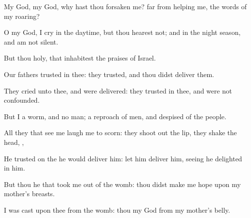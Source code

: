 {\Q {}My
God, my
God, why hast thou
forsaken me?
{}
far from
helping me,
{} the
words of my
roaring?


\par }{\Q {}O my
God, I
cry in the
daytime, but thou
hearest not; and in the night
season, and am not
silent.


\par }{\Q {}But thou
{}
holy,
{} that
inhabitest the
praises of
Israel.


\par }{\Q {}Our
fathers
trusted in thee: they
trusted, and thou didst
deliver them.


\par }{\Q {}They
cried unto thee, and were
delivered: they
trusted in thee, and were not
confounded.


\par }{\Q {}But I
{} a
worm, and no
man; a
reproach of
men, and
despised of the
people.


\par }{\Q {}All they that
see me laugh me to
scorn: they shoot
out the
lip, they
shake the
head,
{},


\par }{\Q {}He
trusted on the
{}
{} he would
deliver him: let him
deliver him, seeing he
delighted in him.


\par }{\Q {}But thou
{} he that
took me out of the
womb: thou didst make me
hope
{} upon my
mother’s
breasts.


\par }{\Q {}I was
cast upon thee from the
womb: thou
{} my
God from my
mother’s
belly.


\par }{\BB \par }
